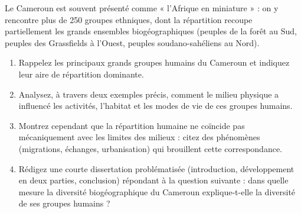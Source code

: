 \documentclass[11pt]{article}
\begin{document}
\begin{exercice}
Le Cameroun est souvent présenté comme « l'Afrique en miniature » : on y rencontre plus de 250 groupes ethniques, dont la répartition recoupe partiellement les grands ensembles biogéographiques (peuples de la forêt au Sud, peuples des Grassfields à l'Ouest, peuples soudano-sahéliens au Nord).

\begin{enumerate}
\item Rappelez les principaux grands groupes humains du Cameroun et indiquez leur aire de répartition dominante.
\item Analysez, à travers deux exemples précis, comment le milieu physique a influencé les activités, l'habitat et les modes de vie de ces groupes humains.
\item Montrez cependant que la répartition humaine ne coïncide pas mécaniquement avec les limites des milieux : citez des phénomènes (migrations, échanges, urbanisation) qui brouillent cette correspondance.
\item Rédigez une courte dissertation problématisée (introduction, développement en deux parties, conclusion) répondant à la question suivante : dans quelle mesure la diversité biogéographique du Cameroun explique-t-elle la diversité de ses groupes humains ?
\end{enumerate}
\end{exercice}
\end{document}
